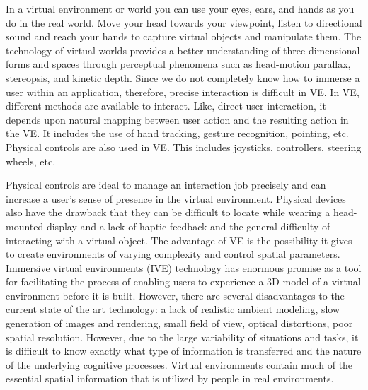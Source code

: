 In a virtual environment or world you can use your eyes, ears, and hands as you do in the real world. Move your head towards your viewpoint, listen to directional sound and reach your hands to capture virtual objects and manipulate them. The technology of virtual worlds provides a better understanding of three-dimensional forms and spaces through perceptual phenomena such as head-motion parallax, stereopsis, and kinetic depth. Since we do not completely know how to immerse a user within an application, therefore, precise interaction is difficult in VE. In VE, different methods are available to interact. Like, direct user interaction, it depends upon natural mapping between user action and the resulting action in the VE. It includes the use of hand tracking, gesture recognition, pointing, etc. Physical controls are also used in VE. This includes joysticks, controllers, steering wheels, etc.\cite{fraser2000revealing} \par
Physical controls are ideal to manage an interaction job precisely and can increase a user's sense of presence in the virtual environment. Physical devices also have the drawback that they can be difficult to locate while wearing a head-mounted display and a lack of haptic feedback and the general difficulty of interacting with a virtual object. The advantage of VE is the possibility it gives to create environments of varying complexity and control spatial parameters. Immersive virtual environments (IVE) technology has enormous promise as a tool for facilitating the process of enabling users to experience a 3D model of a virtual environment before it is built. However, there are several disadvantages to the current state of the art technology: a lack of realistic ambient modeling, slow generation of images and rendering, small field of view, optical distortions, poor spatial resolution.
However, due to the large variability of situations and tasks, it is difficult to know exactly what type of information is transferred and the nature of the underlying cognitive processes.
Virtual environments contain much of the essential spatial information that is utilized by people in real environments.\cite{waller1998transfer}



